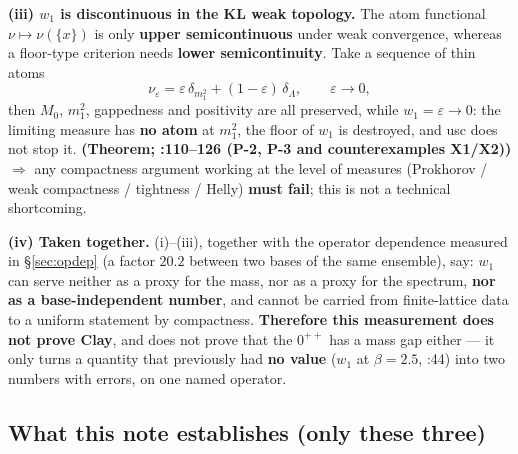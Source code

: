 \documentclass[11pt,a4paper]{article}
\newcommand{\code}[1]{\texttt{\footnotesize\detokenize{#1}}}
\newcommand{\gr}[1]{\textbf{(#1)}}
\begin{document}
\textbf{(iii) $w_1$ is discontinuous in the KL weak topology.} The atom functional $\nu\mapsto\nu(\{x\})$ is only \textbf{upper semicontinuous}
under weak convergence, whereas a floor-type criterion needs \textbf{lower semicontinuity}. Take a sequence of thin atoms
\begin{equation}
  \nu_\varepsilon=\varepsilon\,\delta_{m_1^2}+(1-\varepsilon)\,\delta_\Lambda,
  \qquad \varepsilon\to0,
\end{equation}
then $M_0$, $m_1^2$, gappedness and positivity are all preserved, while $w_1=\varepsilon\to0$: the limiting measure has \textbf{no atom} at $m_1^2$,
the floor of $w_1$ is destroyed, and usc does not stop it.
\gr{Theorem; \code{U01.md}:110--126 (P-2, P-3 and counterexamples X1/X2)}
$\Rightarrow$ any compactness argument working at the level of measures (Prokhorov / weak compactness / tightness / Helly) \textbf{must fail};
this is not a technical shortcoming.

\textbf{(iv) Taken together.} (i)--(iii), together with the operator dependence measured in \S\ref{sec:opdep} (a factor $20.2$ between two bases
of the same ensemble), say: $w_1$ can serve neither as a proxy for the mass, nor as a proxy for the spectrum, \textbf{nor as a base-independent
number}, and cannot be carried from finite-lattice data to a uniform statement by compactness. \textbf{Therefore this measurement does not prove
Clay}, and does not prove that the $0^{++}$ has a mass gap either --- it only turns a quantity that previously had \textbf{no value}
($w_1$ at $\beta=2.5$, \code{U02.md}:44) into two numbers with errors, on one named operator.

\subsection*{What this note establishes (only these three)}
\end{document}
